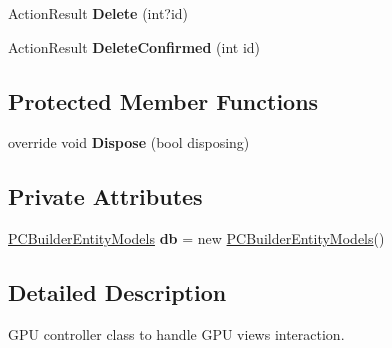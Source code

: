 \begin{DoxyCompactItemize}
\item 
Action\+Result {\bfseries Delete} (int?id)\hypertarget{class_p_c_builder_m_v_c_1_1_controllers_1_1_g_p_u_controller_abf8b845362784a12062436f4720b14e6}{}\label{class_p_c_builder_m_v_c_1_1_controllers_1_1_g_p_u_controller_abf8b845362784a12062436f4720b14e6}

\item 
Action\+Result {\bfseries Delete\+Confirmed} (int id)\hypertarget{class_p_c_builder_m_v_c_1_1_controllers_1_1_g_p_u_controller_aab97b4bb193c7a42426beaa2c5ef2288}{}\label{class_p_c_builder_m_v_c_1_1_controllers_1_1_g_p_u_controller_aab97b4bb193c7a42426beaa2c5ef2288}

\end{DoxyCompactItemize}
\subsection*{Protected Member Functions}
\begin{DoxyCompactItemize}
\item 
override void {\bfseries Dispose} (bool disposing)\hypertarget{class_p_c_builder_m_v_c_1_1_controllers_1_1_g_p_u_controller_a034e1443604844a81742a6c4e2dd5ccf}{}\label{class_p_c_builder_m_v_c_1_1_controllers_1_1_g_p_u_controller_a034e1443604844a81742a6c4e2dd5ccf}

\end{DoxyCompactItemize}
\subsection*{Private Attributes}
\begin{DoxyCompactItemize}
\item 
\hyperlink{class_p_c_builder_m_v_c_1_1_models_1_1_p_c_builder_entity_models}{P\+C\+Builder\+Entity\+Models} {\bfseries db} = new \hyperlink{class_p_c_builder_m_v_c_1_1_models_1_1_p_c_builder_entity_models}{P\+C\+Builder\+Entity\+Models}()\hypertarget{class_p_c_builder_m_v_c_1_1_controllers_1_1_g_p_u_controller_a2d429161edc3b0d41d4b6ffedd323386}{}\label{class_p_c_builder_m_v_c_1_1_controllers_1_1_g_p_u_controller_a2d429161edc3b0d41d4b6ffedd323386}

\end{DoxyCompactItemize}


\subsection{Detailed Description}
G\+PU controller class to handle G\+PU views interaction. 

